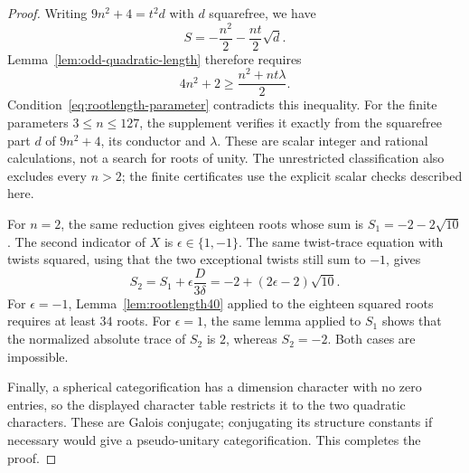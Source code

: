 \begin{proof}
Writing $9n^2+4=t^2d$ with $d$ squarefree, we have
\[
 S=-\frac{n^2}{2}-\frac{nt}{2}\sqrt d.
\]
Lemma~\ref{lem:odd-quadratic-length} therefore requires
\[
 4n^2+2\geq\frac{n^2+nt\lambda}{2}.
\]
Condition~\eqref{eq:rootlength-parameter} contradicts this inequality.
For the finite parameters $3\leq n\leq127$, the supplement verifies it
exactly from the squarefree part $d$ of $9n^2+4$, its conductor and
$\lambda$. These are scalar integer and rational calculations, not a
search for roots of unity. The unrestricted classification also excludes every $n>2$; the finite
certificates use the explicit scalar checks described here.

For $n=2$, the same reduction gives eighteen roots whose sum is
$S_1=-2-2\sqrt{10}$. The second indicator of $X$ is
$\epsilon\in\{1,-1\}$. The same twist-trace equation with twists squared,
using that the two exceptional twists still sum to $-1$, gives
\[
 S_2=S_1+\epsilon\frac{D}{3\delta}
     =-2+(2\epsilon-2)\sqrt{10}.
\]
For $\epsilon=-1$, Lemma~\ref{lem:rootlength40} applied to the eighteen
squared roots requires at least $34$ roots. For $\epsilon=1$, the same
lemma applied to $S_1$ shows that the normalized absolute trace of $S_2$
is $2$, whereas $S_2=-2$. Both cases are impossible.

Finally, a spherical categorification has a dimension character with no zero entries,
so the displayed character table restricts it to the two quadratic characters.
These are Galois conjugate; conjugating its structure constants if necessary
would give a pseudo-unitary categorification. This completes the proof.
\end{proof}
